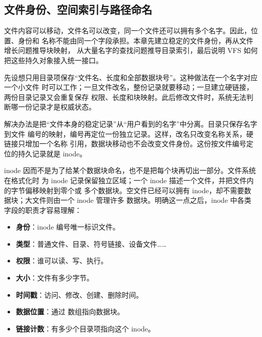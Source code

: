 \begin{filesystemlayout}

\chapter{文件身份、空间索引与路径命名}
\begin{keyidea}
文件内容可以移动，文件名可以改变，同一个文件还可以拥有多个名字。因此，位置、身份和
名称不能由同一个字段承担。本章先建立稳定的文件身份，再从文件增长问题推导块映射，
从大量名字的查找问题推导目录索引，最后说明 VFS 如何把这些持久对象接入统一接口。
\end{keyidea}

\label{sec:inode-deep}


先设想只用目录项保存“文件名、长度和全部数据块号”。这种做法在一个名字对应一个小文件
时可以工作；一旦文件改名，整份记录就要移动；一旦建立硬链接，两份目录记录又会重复保存
权限、长度和块映射。此后修改文件时，系统无法判断哪一份记录才是权威状态。

解决办法是把“文件本身的稳定记录”从“用户看到的名字”中分离。目录只保存名字到文件
编号的映射，编号再定位一份独立记录。这样，改名只改变名称关系，硬链接只增加一个名称
引用，数据块移动也不会改变文件身份。这份按文件编号定位的持久记录就是 inode。

inode 因而不是为了给某个数据块命名，也不是把每个块再切出一部分。文件系统在格式化时
为 inode 记录保留独立区域；一个 inode 描述一个文件，并把文件内的字节偏移映射到零个或
多个数据块。空文件已经可以拥有 inode，却不需要数据块；大文件则由一个 inode 管理许多
数据块。明确这一点之后，inode 中各类字段的职责才容易理解：

\begin{itemize}\tightlist
\item \textbf{身份}：inode 编号唯一标识文件。
\item \textbf{类型}：普通文件、目录、符号链接、设备文件……
\item \textbf{权限}：谁可以读、写、执行。
\item \textbf{大小}：文件有多少字节。
\item \textbf{时间戳}：访问、修改、创建、删除时间。
\item \textbf{数据位置}：通过  数组指向数据块。
\item \textbf{链接计数}：有多少个目录项指向这个 inode。
\end{itemize}


\end{filesystemlayout}

